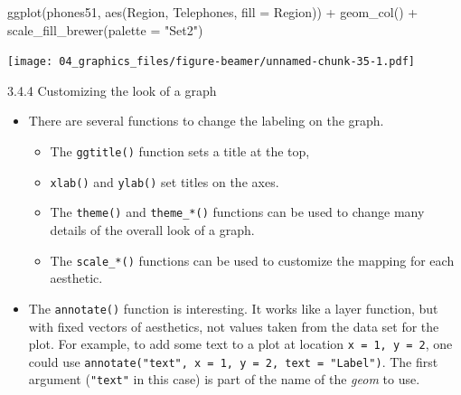 \documentclass[
  9pt,
  a4paper,
  ignorenonframetext,
  notheorems]{beamer}
\newenvironment{Shaded}{\begin{snugshade}}{\end{snugshade}}
\newcommand{\AttributeTok}[1]{\textcolor[rgb]{0.40,0.45,0.13}{#1}}
\newcommand{\FunctionTok}[1]{\textcolor[rgb]{0.28,0.35,0.67}{#1}}
\newcommand{\NormalTok}[1]{\textcolor[rgb]{0.00,0.23,0.31}{#1}}
\newcommand{\SpecialCharTok}[1]{\textcolor[rgb]{0.37,0.37,0.37}{#1}}
\newcommand{\StringTok}[1]{\textcolor[rgb]{0.13,0.47,0.30}{#1}}
\providecommand{\tightlist}{%
  \setlength{\itemsep}{0pt}\setlength{\parskip}{0pt}}\usepackage{longtable,booktabs,array}
\begin{document}
\begin{frame}[fragile]
\begin{Shaded}
\begin{Highlighting}[]
\FunctionTok{ggplot}\NormalTok{(phones51, }\FunctionTok{aes}\NormalTok{(Region, Telephones, }\AttributeTok{fill =}\NormalTok{ Region)) }\SpecialCharTok{+} 
  \FunctionTok{geom\_col}\NormalTok{() }\SpecialCharTok{+} \FunctionTok{scale\_fill\_brewer}\NormalTok{(}\AttributeTok{palette =} \StringTok{"Set2"}\NormalTok{)}
\end{Highlighting}
\end{Shaded}

\texttt{[image: 04\_graphics\_files/figure-beamer/unnamed-chunk-35-1.pdf]}
\end{frame}

\begin{frame}[fragile]
\begin{block}{3.4.4 Customizing the look of a graph}
\protect\hypertarget{customizing-the-look-of-a-graph}{}
\begin{itemize}
\tightlist
\item
  There are several functions to change the labeling on the graph.

  \begin{itemize}
  \tightlist
  \item
    The \texttt{ggtitle()} function sets a title at the top,
  \item
    \texttt{xlab()} and \texttt{ylab()} set titles on the axes.
  \item
    The \texttt{theme()} and \texttt{theme\_*()} functions can be used
    to change many details of the overall look of a graph.
  \item
    The \texttt{scale\_*()} functions can be used to customize the
    mapping for each aesthetic.
  \end{itemize}
\item
  The \texttt{annotate()} function is interesting. It works like a layer
  function, but with fixed vectors of aesthetics, not values taken from
  the data set for the plot. For example, to add some text to a plot at
  location \texttt{x\ =\ 1,\ y\ =\ 2}, one could use
  \texttt{annotate("text",\ x\ =\ 1,\ y\ =\ 2,\ text\ =\ "Label")}. The
  first argument (\texttt{"text"} in this case) is part of the name of
  the \emph{geom} to use.
\end{itemize}
\end{block}
\end{frame}
\end{document}
